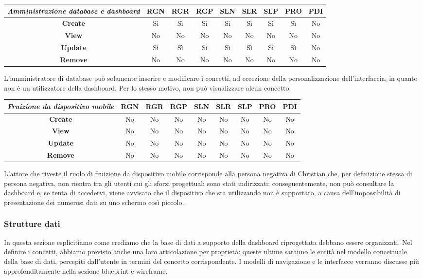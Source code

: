 {
\renewcommand{\arraystretch}{2}
\begin{longtable}[h]{| c | c | c | c | c | c | c | c | c |}
    \hline
    \textit{Amministrazione database e dashboard} & \textbf{RGN} & \textbf{RGR} & \textbf{RGP} & \textbf{SLN} & \textbf{SLR} & \textbf{SLP} & \textbf{PRO} & \textbf{PDI} \\
    \hline
    \endhead
    \textbf{Create} & Sì & Sì & Sì & Sì & Sì & Sì & Sì & No \\
    \hline
    \textbf{View}   & No & No & No & No & No & No & No & No \\
    \hline
    \textbf{Update} & Sì & Sì & Sì & Sì & Sì & Sì & Sì & No \\
    \hline
    \textbf{Remove} & No & No & No & No & No & No & No & No \\
    \hline
\end{longtable}
}
\noindent
L'amministratore di database può solamente inserire e modificare i concetti, ad eccezione della personalizzazione dell'interfaccia, in quanto non è un utilizzatore della dashboard.
Per lo stesso motivo, non può visualizzare alcun concetto.

{
\renewcommand{\arraystretch}{2}
\begin{longtable}[h]{| c | c | c | c | c | c | c | c | c |}
    \hline
    \textit{Fruizione da dispositivo mobile} & \textbf{RGN} & \textbf{RGR} & \textbf{RGP} & \textbf{SLN} & \textbf{SLR} & \textbf{SLP} & \textbf{PRO} & \textbf{PDI} \\
    \hline
    \endhead
    \textbf{Create} & No & No & No & No & No & No & No & No \\
    \hline
    \textbf{View}   & No & No & No & No & No & No & No & No \\
    \hline
    \textbf{Update} & No & No & No & No & No & No & No & No \\
    \hline
    \textbf{Remove} & No & No & No & No & No & No & No & No \\
    \hline
\end{longtable}
}
\noindent
L'attore che riveste il ruolo di fruizione da dispositivo mobile corrisponde alla persona negativa di Christian che, per definizione stessa di persona negativa, non rientra tra gli utenti cui gli sforzi progettuali sono stati indirizzati: conseguentemente, non può consultare la dashboard e, se tenta di accedervi, viene avvisato che il dispositivo che sta utilizzando non è supportato, a causa dell'impossibilità di presentazione dei numerosi dati su uno schermo così piccolo.

\subsubsection{Strutture dati}
In questa sezione esplicitiamo come crediamo che la base di dati a supporto della dashboard riprogettata debbano essere organizzati. Nel definire i concetti, abbiamo previsto anche una loro articolazione per proprietà: queste ultime saranno le entità nel modello concettuale della base di dati, percepiti dall'utente in termini del concetto corrispondente.
I modelli di navigazione e le interfacce verranno discusse più approfonditamente nella sezione blueprint e wireframe.